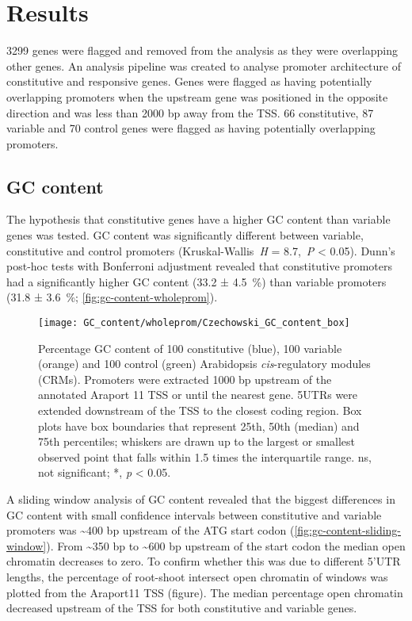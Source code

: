 \documentclass[../Sam_Witham_Thesis.tex]{subfiles}
\begin{document}
\section{Results}\label{chapter1:results}

3299 genes were flagged and removed from the analysis as they were overlapping other genes.
An analysis pipeline was created to analyse promoter architecture of constitutive and responsive genes.
Genes were flagged as having potentially overlapping promoters when the upstream gene was positioned in the opposite direction and was less than 2000 bp away from the TSS.
66 constitutive, 87 variable and 70 control genes were flagged as having potentially overlapping promoters.


\subsection{GC content}

The hypothesis that constitutive genes have a higher GC content than variable genes was tested.
GC content was significantly different between variable, constitutive and control promoters (Kruskal\hyp{}Wallis~\textit{H} = 8.7,~\textit{P} \textless{} 0.05).
Dunn's post\hyp{}hoc tests with Bonferroni adjustment revealed that constitutive promoters had a significantly higher GC content (33.2 ± \SI{4.5}{\percent}) than variable promoters (31.8 ± \SI{3.6}{\percent}; \autoref{fig:gc-content-wholeprom}).

\begin{figure}[!h]
	\begin{center}
		\capstart
		\texttt{[image: GC\_content/wholeprom/Czechowski\_GC\_content\_box]}
		\caption{
			Percentage GC content of 100 constitutive (blue), 100 variable (orange) and 100 control (green) Arabidopsis \textit{cis}\hyp{}regulatory modules (CRMs).
			Promoters were extracted 1000 bp upstream of the annotated Araport 11 \autocite{chengAraport11CompleteReannotation2017} TSS or until the nearest gene.
			5UTRs were extended downstream of the TSS to the closest coding region.  Box plots have box boundaries that represent 25th, 50th (median) and 75th percentiles; whiskers are drawn up to the largest or smallest observed point that falls within 1.5 times the interquartile range.
			ns, not significant; *, \textit{p} \textless{} 0.05.
			\label{fig:gc-content-wholeprom}
		}
	\end{center}
\end{figure}

A sliding window analysis of GC content revealed that the biggest differences in GC content with small confidence intervals between constitutive and variable promoters was \textasciitilde{}400 bp upstream of the ATG start codon (\autoref{fig:gc-content-sliding-window}).
From \textasciitilde{}350 bp to \textasciitilde{}600 bp upstream of the start codon the median open chromatin decreases to zero.
To confirm whether this was due to different 5'UTR lengths, the percentage of root\hyp{}shoot intersect open chromatin of windows was plotted from the Araport11 TSS (figure).
The median percentage open chromatin decreased upstream of the TSS for both constitutive and variable genes.
\end{document}
